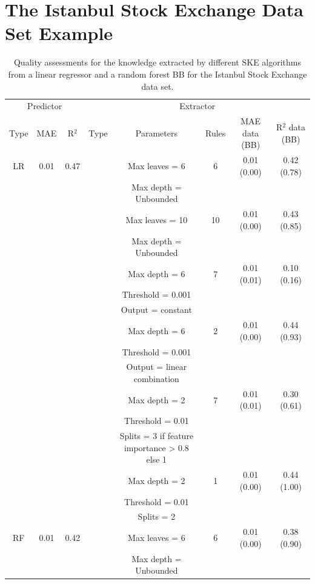 \documentclass[sigconf]{acmart}
\begin{document}
\section{The Istanbul Stock Exchange Data Set Example}

\begin{table}[t]\centering
	\caption{Quality assessments for the knowledge extracted by different SKE algorithms from a linear regressor and a random forest BB for the Istanbul Stock Exchange data set.}\label{tab:experiments}
	\begin{tabular}{cccccccc}
		\toprule
		\multicolumn{3}{c}{Predictor} &\multicolumn{5}{c}{Extractor} \\
		\cmidrule(lr){1-3}
		\cmidrule(lr){4-8}
		Type & MAE & R$^2$ & Type & Parameters & Rules & MAE data (BB) & R$^2$ data (BB) \\
		\midrule
		LR & 0.01 & 0.47 & \cart{} & Max leaves = 6 & 6 & 0.01 (0.00) & 0.42 (0.78) \\
		& & & & Max depth = Unbounded & & & \\
		\cmidrule(lr){4-8}
		& & & \cart{} & Max leaves = 10 & 10 & 0.01 (0.00) & 0.43 (0.85) \\
		& & & & Max depth = Unbounded & & & \\
		\cmidrule(lr){4-8}
		& & & \creepy{} & Max depth = 6 & 7 & 0.01 (0.01) & 0.10 (0.16) \\
		& & & & Threshold = 0.001 & & & \\
		& & & & Output = constant & & & \\
		\cmidrule(lr){4-8}
		& & & \creepy{} & Max depth = 6 & 2 & 0.01 (0.00) & 0.44 (0.93) \\
		& & & & Threshold = 0.001 & & & \\
		& & & & Output = linear combination & & & \\
		\cmidrule(lr){4-8}
		& & & \gridex{} & Max depth = 2 & 7 & 0.01 (0.01) & 0.30 (0.61) \\
		& & & & Threshold = 0.01 & & & \\
		& & & & Splits = 3 if feature importance > 0.8 else 1 & & & \\
		\cmidrule(lr){4-8}
		& & & \gridrex{} & Max depth = 2 & 1 & 0.01 (0.00) & 0.44 (1.00) \\
		& & & & Threshold = 0.01 & & & \\
		& & & & Splits = 2 & & & \\
		\midrule
		RF & 0.01 & 0.42 & \cart{} & Max leaves = 6 & 6 & 0.01 (0.00) & 0.38 (0.90) \\
		& & & & Max depth = Unbounded & & & \\

\end{tabular}
\end{table}
\end{document}
